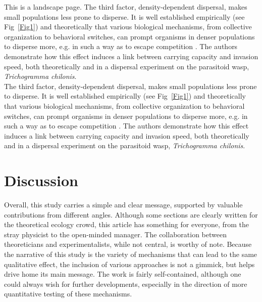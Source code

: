 \documentclass[a4paper]{article}
\begin{document}
\begin{landscape}

This is a landscape page. The third factor, density-dependent dispersal, makes small populations less prone to disperse. It is well established empirically (see Fig~\ref{Fig1}) and theoretically that various biological mechanisms, from collective organization to behavioral switches, can prompt organisms in denser populations to disperse more, e.g. in such a way as to escape competition \parencite{matthysen2005density}. The authors demonstrate how this effect induces a link between carrying capacity and invasion speed, both theoretically and in a dispersal experiment on the parasitoid wasp, \emph{Trichogramma chilonis}.\\
The third factor, density-dependent dispersal, makes small populations less prone to disperse. It is well established empirically (see Fig~\ref{Fig1}) and theoretically that various biological mechanisms, from collective organization to behavioral switches, can prompt organisms in denser populations to disperse more, e.g. in such a way as to escape competition \parencite{matthysen2005density}. The authors demonstrate how this effect induces a link between carrying capacity and invasion speed, both theoretically and in a dispersal experiment on the parasitoid wasp, \emph{Trichogramma chilonis}.\\

\end{landscape}

\section*{\centering Discussion}
Overall, this study carries a simple and clear message, supported by valuable contributions from different angles. Although some sections are clearly written for the theoretical ecology crowd, this article has something for everyone, from the stray physicist to the open-minded manager. The collaboration between theoreticians and experimentalists, while not central, is worthy of note. Because the narrative of this study is the variety of mechanisms that can lead to the same qualitative effect, the inclusion of various approaches is not a gimmick, but helps drive home its main message. The work is fairly self-contained, although one could always wish for further developments, especially in the direction of more quantitative testing of these mechanisms. \\ 
\end{document}
